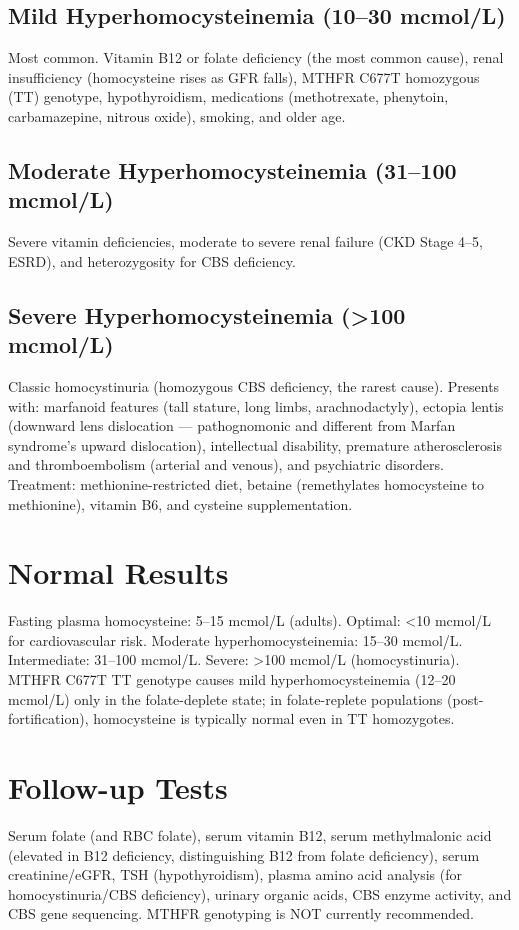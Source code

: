 \subsection*{Mild Hyperhomocysteinemia (10--30 mcmol/L)}
Most common. Vitamin B12 or folate deficiency (the most common cause), renal insufficiency (homocysteine rises as GFR falls), MTHFR C677T homozygous (TT) genotype, hypothyroidism, medications (methotrexate, phenytoin, carbamazepine, nitrous oxide), smoking, and older age.
\subsection*{Moderate Hyperhomocysteinemia (31--100 mcmol/L)}
Severe vitamin deficiencies, moderate to severe renal failure (CKD Stage 4--5, ESRD), and heterozygosity for CBS deficiency.
\subsection*{Severe Hyperhomocysteinemia (>100 mcmol/L)}
Classic homocystinuria (homozygous CBS deficiency, the rarest cause). Presents with: marfanoid features (tall stature, long limbs, arachnodactyly), ectopia lentis (downward lens dislocation --- pathognomonic and different from Marfan syndrome's upward dislocation), intellectual disability, premature atherosclerosis and thromboembolism (arterial and venous), and psychiatric disorders. Treatment: methionine-restricted diet, betaine (remethylates homocysteine to methionine), vitamin B6, and cysteine supplementation.
\section*{Normal Results}
Fasting plasma homocysteine: 5--15 mcmol/L (adults). Optimal: <10 mcmol/L for cardiovascular risk. Moderate hyperhomocysteinemia: 15--30 mcmol/L. Intermediate: 31--100 mcmol/L. Severe: >100 mcmol/L (homocystinuria). MTHFR C677T TT genotype causes mild hyperhomocysteinemia (12--20 mcmol/L) only in the folate-deplete state; in folate-replete populations (post-fortification), homocysteine is typically normal even in TT homozygotes.
\section*{Follow-up Tests}
Serum folate (and RBC folate), serum vitamin B12, serum methylmalonic acid (elevated in B12 deficiency, distinguishing B12 from folate deficiency), serum creatinine/eGFR, TSH (hypothyroidism), plasma amino acid analysis (for homocystinuria/CBS deficiency), urinary organic acids, CBS enzyme activity, and CBS gene sequencing. MTHFR genotyping is NOT currently recommended.
